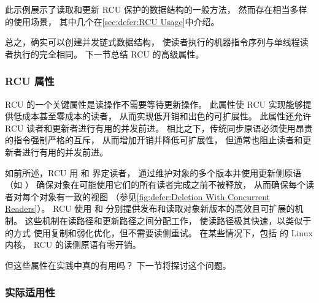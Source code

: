 此示例展示了读取和更新 RCU 保护的数据结构的一般方法，
然而存在相当多样的使用场景，
其中几个在\cref{sec:defer:RCU Usage}中介绍。

总之，确实可以创建并发链式数据结构，
使读者执行的机器指令序列与单线程读者执行的完全相同。
下一节总结 RCU 的高级属性。

\subsubsection{RCU 属性}
\label{sec:defer:RCU Properties}

RCU 的一个关键属性是读操作不需要等待更新操作。
此属性使 RCU 实现能够提供低成本甚至零成本的读者，
从而实现低开销和出色的可扩展性。
此属性还允许 RCU 读者和更新者进行有用的并发前进。
相比之下，传统同步原语必须使用昂贵的指令强制严格的互斥，
从而增加开销并降低可扩展性，
但通常也阻止读者和更新者进行有用的并发前进。

\QuickQuizEnd

如前所述，RCU 用  和
 界定读者，
通过维护对象的多个版本并使用更新侧原语（如 ）
确保对象在可能使用它们的所有读者完成之前不被释放，
从而确保每个读者对每个对象有一致的视图
（参见\cref{fig:defer:Deletion With Concurrent Readers}）。
RCU 使用  和 
分别提供发布和读取对象新版本的高效且可扩展的机制。
这些机制在读路径和更新路径之间分配工作，
使读路径极其快速，以类似于的方式
使用复制和弱化优化，但不需要读侧重试。
在某些情况下，包括  的 Linux 内核，
RCU 的读侧原语有零开销。

但这些属性在实践中真的有用吗？
下一节将探讨这个问题。

\subsubsection{实际适用性}
\label{sec:defer:Practical Applicability}

